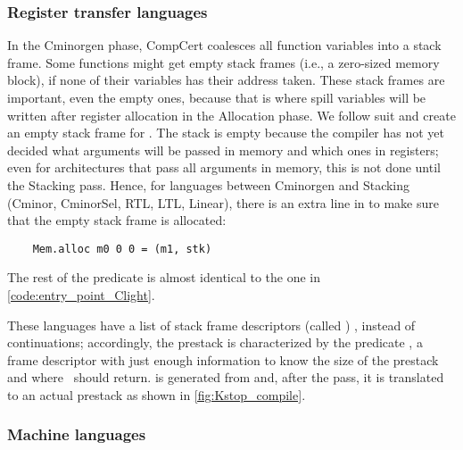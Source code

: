
\subsubsection{Register transfer languages}
In the Cminorgen phase, CompCert coalesces  all function variables into a stack frame. Some functions might get empty stack frames (i.e., a zero-sized memory block), if none of their variables has their address taken. These stack frames are important, even the empty ones, because that is where spill variables will be written after register allocation in the Allocation phase. We follow suit and create an empty stack frame for . The stack is empty because the compiler has not yet decided what arguments will be passed in memory and which ones in registers; even for architectures that pass all arguments in memory, this is not done until the Stacking pass. Hence, for languages between Cminorgen and Stacking (Cminor, CminorSel, RTL, LTL, Linear), there is an extra line in  to make sure that the empty stack frame is allocated:
\begin{lstlisting}
	Mem.alloc m0 0 0 = (m1, stk) \end{lstlisting}
The rest of the predicate is almost identical to the one in \autoref{code:entry_point_Clight}.

These languages have a list of stack frame descriptors (called ) , instead of continuations; accordingly, the prestack is characterized by the predicate , a frame descriptor with just enough information to know the size of the prestack and where \main\ should return.  is generated from  and, after the  pass, it is translated to an actual prestack as shown in \autoref{fig:Kstop_compile}.

\subsubsection{Machine languages}

